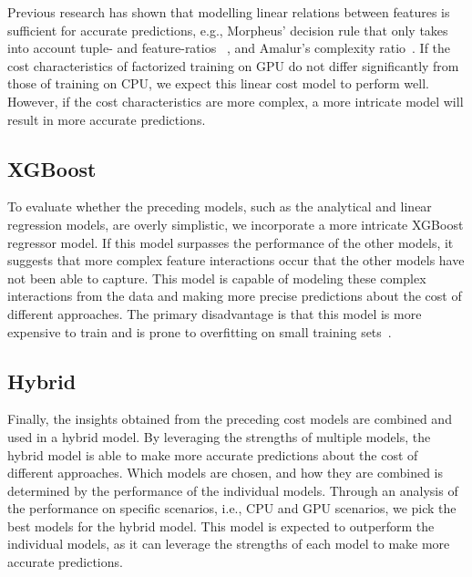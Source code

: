 Previous research has shown that modelling linear relations between features is sufficient for accurate predictions, e.g., Morpheus' decision rule that only takes into account tuple- and feature-ratios ~\cite{morpheus}, and Amalur's complexity ratio~\cite{amalur}. If the cost characteristics of factorized training on GPU do not differ significantly from those of training on CPU, we expect this linear cost model to perform well. However, if the cost characteristics are more complex, a more intricate model will result in more accurate predictions.

\subsection{XGBoost}
To evaluate whether the preceding models, such as the analytical and linear regression models, are overly simplistic, we incorporate a more intricate XGBoost regressor model. If this model surpasses the performance of the other models, it suggests that more complex feature interactions occur that the other models have not been able to capture. This model is capable of modeling these complex interactions from the data and making more precise predictions about the cost of different approaches. The primary disadvantage is that this model is more expensive to train and is prone to overfitting on small training sets~\cite{xgboost}.

\subsection{Hybrid}
Finally, the insights obtained from the preceding cost models are combined and used in a hybrid model. By leveraging the strengths of multiple models, the hybrid model is able to make more accurate predictions about the cost of different approaches. Which models are chosen, and how they are combined is determined by the performance of the individual models. Through an analysis of the performance on specific scenarios, i.e., CPU and GPU scenarios, we pick the best models for the hybrid model. This model is expected to outperform the individual models, as it can leverage the strengths of each model to make more accurate predictions.